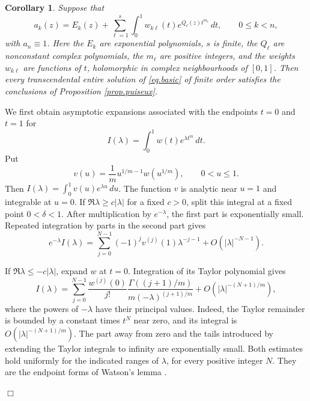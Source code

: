 \documentclass[a4paper,12pt]{article}
\newtheorem{corollary}[defin]{Corollary}
\newenvironment{proof}
{\noindent{\it Proof.}}{\hfill $\Box$\par\vspace{2.5mm}}
\numberwithin{equation}{section}
\begin{document}
\begin{corollary}\label{cor.polynomial.kernels}
Suppose that
\begin{equation}\label{eq.polynomial.kernel.coefficients}
 a_k(z)=E_k(z)+\sum_{\ell=1}^{s}
       \int_0^1 w_{k\ell}(t)e^{Q_\ell(z)t^{m_\ell}}\,dt,
 \qquad 0\le k<n,
\end{equation}
with $a_n\equiv1$.
Here the $E_k$ are exponential polynomials, $s$ is finite,
the $Q_\ell$ are nonconstant complex polynomials,
the $m_\ell$ are positive integers, and the weights $w_{k\ell}$
are functions of $t$, holomorphic in complex neighbourhoods of $[0,1]$.
Then every transcendental entire solution of \eqref{eq.basic}
of finite order satisfies the conclusions of Proposition
\ref{prop.puiseux}.
\end{corollary}
\begin{proof}
We first obtain asymptotic expansions associated with the endpoints
$t=0$ and $t=1$ for
\[
 I(\lambda)=\int_0^1 w(t)e^{\lambda t^m}\,dt.
\]
Put
\[
 v(u)=\frac1m u^{1/m-1}w(u^{1/m}),\qquad 0<u\le1.
\]
Then $I(\lambda)=\int_0^1v(u)e^{\lambda u}\,du$.
The function $v$ is analytic near $u=1$ and integrable at $u=0$.
If $\Re\lambda\ge c|\lambda|$ for a fixed $c>0$, split this integral
at a fixed point $0<\delta<1$.
After multiplication by $e^{-\lambda}$, the first part is exponentially
small. Repeated integration by parts in the second part gives
\begin{equation}\label{eq.power.weight.growing}
 e^{-\lambda}I(\lambda)
 =\sum_{j=0}^{N-1}(-1)^jv^{(j)}(1)\lambda^{-j-1}
    +O(|\lambda|^{-N-1}).
\end{equation}

If $\Re\lambda\le-c|\lambda|$, expand $w$ at $t=0$.
Integration of its Taylor polynomial gives
\begin{equation}\label{eq.power.weight.decaying}
 I(\lambda)
 =\sum_{j=0}^{N-1}\frac{w^{(j)}(0)}{j!}
       \frac{\Gamma((j+1)/m)}{m(-\lambda)^{(j+1)/m}}
       +O(|\lambda|^{-(N+1)/m}),
\end{equation}
where the powers of $-\lambda$ have their principal values.
Indeed, the Taylor remainder is bounded by a constant times $t^N$
near zero, and its integral is $O(|\lambda|^{-(N+1)/m})$.
The part away from zero and the tails introduced by extending the
Taylor integrals to infinity are exponentially small.
Both estimates hold uniformly for the indicated ranges of $\lambda$,
for every positive integer $N$.
They are the endpoint forms of Watson's lemma
\cite[Section 2.4(i)]{DLMF}.


\end{proof}
\end{document}
